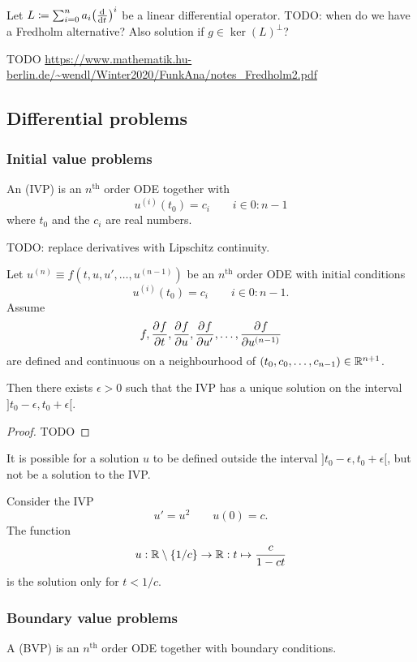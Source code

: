\begin{proposition}
Let $L \defeq \sum_{i=0}^n a_{i} \big(\od{}{t}\big)^i$ be a linear differential operator. TODO: when do we have a Fredholm alternative? Also solution if $g\in \ker(L)^\perp$?
\end{proposition}

TODO \url{https://www.mathematik.hu-berlin.de/~wendl/Winter2020/FunkAna/notes_Fredholm2.pdf}

\subsection{Differential problems}
\subsubsection{Initial value problems}
\begin{definition}
An  (IVP) is an $n^{\text{th}}$ order ODE together with 
\[ u^{(i)}(t_0) = c_i \qquad i \in 0:n-1 \]
where $t_0$ and the $c_i$ are real numbers.
\end{definition}

TODO: replace derivatives with Lipschitz continuity.
\begin{theorem}
Let $u^{(n)} \equiv f(t,u,u',\ldots, u^{(n-1)})$ be an $n^{\text{th}}$ order ODE with initial conditions
\[ u^{(i)}(t_0) = c_i \qquad i \in 0:n-1. \]
Assume
\[ f,  \frac{\partial{^{}}f}{\partial{{t}^{}}} ,  \frac{\partial{^{}}f}{\partial{{u}^{}}} ,  \frac{\partial{^{}}f}{\partial{{u'}^{}}} , \ldots,  \frac{\partial{^{}}f}{\partial{{u^{(n-1)}}^{}}}  \]
are defined and continuous on a neighbourhood of $(t_0, c_0, \ldots, c_{n-1})\in \mathbb{R}^{n+1}$.

Then there exists $\epsilon > 0$ such that the IVP has a unique solution on the interval $]t_0-\epsilon, t_0+\epsilon[$.
\end{theorem}
\begin{proof}
TODO
\end{proof}

It is possible for a solution $u$ to be defined outside the interval $]t_0-\epsilon, t_0+\epsilon[$, but not be a solution to the IVP.
\begin{example}
Consider the IVP
\[ u' = u^2 \qquad u(0) = c. \]
The function
\[ u: \mathbb{R}\setminus\{1/c\} \to \mathbb{R}: t\mapsto \frac{c}{1-ct} \]
is the solution only for $t < 1/c$.
\end{example}

\subsubsection{Boundary value problems}
\begin{definition}
A  (BVP) is an $n^{\text{th}}$ order ODE together with boundary conditions.
\end{definition}

